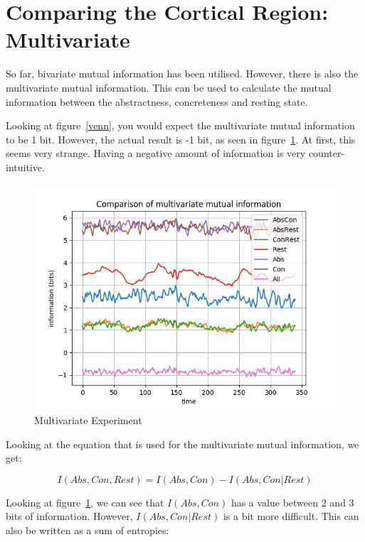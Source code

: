 \section{Comparing the Cortical Region: Multivariate}\label{analysis2}

So far, bivariate mutual information has been utilised. However, there is also the multivariate mutual information. This can be used to calculate the mutual information between the abstractness, concreteness and resting state. 

Looking at figure~\ref{venn}, you would expect the multivariate mutual information to be 1 bit. However, the actual result is -1 bit, as seen in figure~\ref{mul-all-channel-1}. At first, this seems very strange. Having a negative amount of information is very counter-intuitive.

\begin{figure}[!htb]
\caption{Multivariate Experiment}
\label{mul-all-channel-1}
    \centering
    \includegraphics[width=\textwidth]{fig/mul-all-channel-1}
\end{figure}

Looking at the equation that is used for the multivariate mutual information, we get:

\begin{equation}
I(Abs, Con, Rest) = I(Abs, Con) - I(Abs, Con | Rest)
\end{equation}

Looking at figure~\ref{mul-all-channel-1}, we can see that $I(Abs, Con)$ has a value between 2 and 3 bits of information. However, $I(Abs, Con | Rest)$ is a bit more difficult. This can also be written as a sum of entropies:

